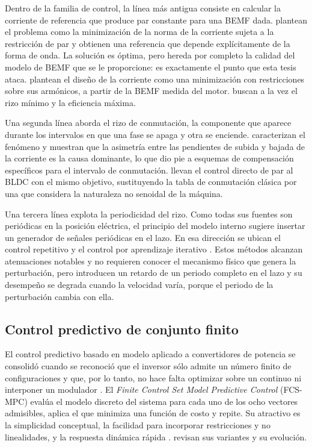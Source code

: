 \documentclass[../../../Tesis_JALS_Maestria.tex]{subfiles}
\begin{document}
Dentro de la familia de control, la línea más antigua consiste en calcular la corriente de referencia que produce par constante para una BEMF dada. \citet{lehuy1986minimization} plantean el problema como la minimización de la norma de la corriente sujeta a la restricción de par y obtienen una referencia que depende explícitamente de la forma de onda. La solución es óptima, pero hereda por completo la calidad del modelo de BEMF que se le proporcione: es exactamente el punto que esta tesis ataca. \citet{hung1993currents} plantean el diseño de la corriente como una minimización con restricciones sobre sus armónicos, a partir de la BEMF medida del motor. \citet{park2000minimum} buscan a la vez el rizo mínimo y la eficiencia máxima.

Una segunda línea aborda el rizo de conmutación, la componente que aparece durante los intervalos en que una fase se apaga y otra se enciende. \citet{carlson1992commutation} caracterizan el fenómeno y muestran que la asimetría entre las pendientes de subida y bajada de la corriente es la causa dominante, lo que dio pie a esquemas de compensación específicos para el intervalo de conmutación. \citet{liu2005dtc} llevan el control directo de par al BLDC con el mismo objetivo, sustituyendo la tabla de conmutación clásica por una que considera la naturaleza no senoidal de la máquina.

Una tercera línea explota la periodicidad del rizo. Como todas sus fuentes son periódicas en la posición eléctrica, el principio del modelo interno sugiere insertar un generador de señales periódicas en el lazo. En esa dirección se ubican el control repetitivo \citep{hara1988repetitive, ahn2003adaptive} y el control por aprendizaje iterativo \citep{qian2004ilc}. Estos métodos alcanzan atenuaciones notables y no requieren conocer el mecanismo físico que genera la perturbación, pero introducen un retardo de un periodo completo en el lazo y su desempeño se degrada cuando la velocidad varía, porque el periodo de la perturbación cambia con ella.

\subsection{Control predictivo de conjunto finito}

El control predictivo basado en modelo aplicado a convertidores de potencia se consolidó cuando se reconoció que el inversor sólo admite un número finito de configuraciones y que, por lo tanto, no hace falta optimizar sobre un continuo ni interponer un modulador \citep{kouro2009mpc}. El \textit{Finite Control Set Model Predictive Control} (FCS-MPC) evalúa el modelo discreto del sistema para cada uno de los ocho vectores admisibles, aplica el que minimiza una función de costo y repite. Su atractivo es la simplicidad conceptual, la facilidad para incorporar restricciones y no linealidades, y la respuesta dinámica rápida \citep{rodriguez2007predictive, rodriguez2012predictive, rodriguez2013stateofart}. \citet{vazquez2017mpc} revisan sus variantes y su evolución.
\end{document}
